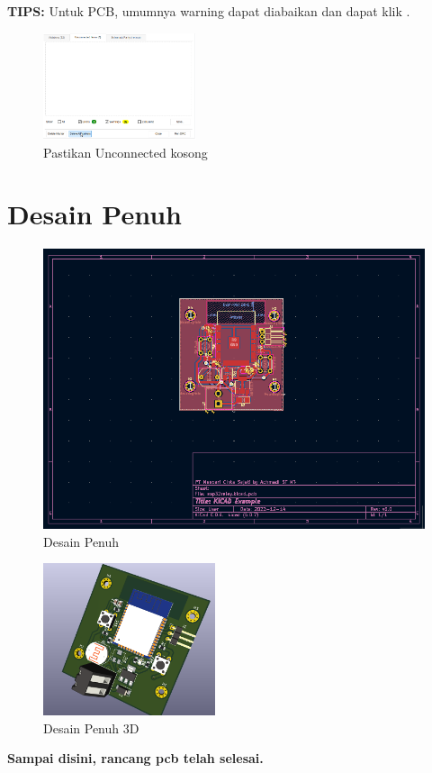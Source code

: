\documentclass[12pt]{book}
\begin{document}
	\textbf{TIPS:} Untuk PCB, umumnya warning dapat diabaikan dan dapat klik .

	\begin{figure}[!ht]
		\centering
		\includegraphics[width=0.4\textwidth]{images/pcb/drc_2}
		\caption{Pastikan Unconnected kosong}
	\end{figure}

	\newpage
	\section{Desain Penuh}

	\begin{figure}[!ht]
		\centering
		\includegraphics[width=\textwidth]{images/pcb/esp32relay}
		\caption{Desain Penuh}
	\end{figure}

	\begin{figure}[!ht]
		\centering
		\includegraphics[width=0.45\textwidth]{images/pcb/esp32relay_3d}
		\caption{Desain Penuh 3D}
	\end{figure}

	\begin{center}
		\textbf{Sampai disini, rancang pcb telah selesai.}
	\end{center}
\end{document}
